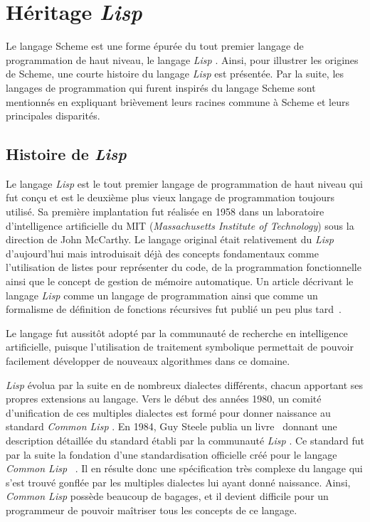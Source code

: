 \documentclass[12pt,oneside,letterpaper,francais]{book}
\newcommand{\lisp}{{\textit{Lisp }}}
\newcommand{\clisp}{{\textit{Common Lisp }}}
\begin{document}
\section{Héritage \lisp}
\label{Scheme:hist}

Le langage Scheme est une forme épurée du tout premier langage de
programmation de haut niveau, le langage \lisp. Ainsi, pour illustrer
les origines de Scheme, une courte histoire du langage \lisp est
présentée. Par la suite, les langages de programmation qui furent
inspirés du langage Scheme sont mentionnés en expliquant brièvement
leurs racines commune à Scheme et leurs principales disparités.

\subsection{Histoire de \lisp}
Le langage \lisp est le tout premier langage de programmation de haut
niveau qui fut conçu et est le deuxième plus vieux langage de
programmation toujours utilisé. Sa première implantation fut réalisée
en 1958 dans un laboratoire d'intelligence artificielle du MIT
(\textit{Massachusetts Institute of Technology}) sous la direction de
John McCarthy. Le langage original était relativement du \lisp
d'aujourd'hui mais introduisait déjà des concepts fondamentaux comme
l'utilisation de listes pour représenter du code, de la programmation
fonctionnelle ainsi que le concept de gestion de mémoire
automatique. Un article décrivant le langage \lisp comme un langage de
programmation ainsi que comme un formalisme de définition de fonctions
récursives fut publié un peu plus tard~\cite{LISP_ORIGINS}.

Le langage fut aussitôt adopté par la communauté de recherche en
intelligence artificielle, puisque l'utilisation de traitement
symbolique permettait de pouvoir facilement développer de nouveaux
algorithmes dans ce domaine.

\lisp évolua par la suite en de nombreux dialectes différents, chacun
apportant ses propres extensions au langage. Vers le début des années
1980, un comité d'unification de ces multiples dialectes est formé
pour donner naissance au standard \clisp. En 1984, Guy Steele publia
un livre~\cite{CLISP} donnant une description détaillée du standard
établi par la communauté \lisp. Ce standard fut par la suite la
fondation d'une standardisation officielle créé pour le langage
\clisp~\cite{ANSI_CLISP}. Il en résulte donc une spécification très
complexe du langage qui s'est trouvé gonflée par les multiples
dialectes lui ayant donné naissance. Ainsi, \clisp possède beaucoup de
bagages, et il devient difficile pour un programmeur de pouvoir
maîtriser tous les concepts de ce langage.
\end{document}
